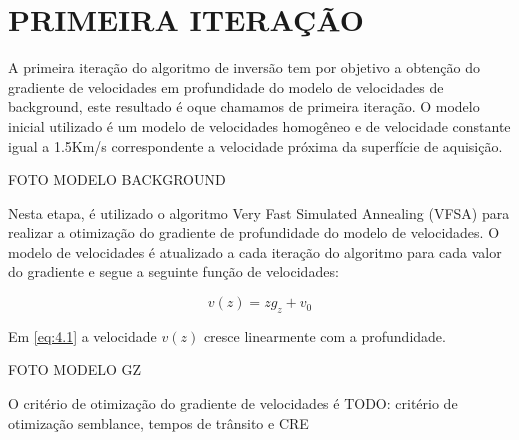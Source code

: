 \chapter{PRIMEIRA ITERAÇÃO}
\label{cap4}

A primeira iteração do algoritmo de inversão tem por objetivo a obtenção do gradiente de
velocidades em profundidade do modelo de velocidades de background, este resultado é oque
chamamos de primeira iteração. O modelo inicial utilizado é um modelo de velocidades homogêneo
e de velocidade constante igual a 1.5Km/s correspondente a velocidade próxima da superfície de aquisição. 

FOTO MODELO BACKGROUND

Nesta etapa, é utilizado o algoritmo Very Fast Simulated Annealing (VFSA) para realizar a otimização do
gradiente de profundidade do modelo de velocidades. O modelo de velocidades é atualizado a cada iteração do
algoritmo para cada valor do gradiente e segue a seguinte função de velocidades:

\begin{equation}
\label{eq:4.1}
v(z)=z g_z+v_0
\end{equation}

Em \ref{eq:4.1} a velocidade $v(z)$ cresce linearmente com a profundidade.

FOTO MODELO GZ

O critério de otimização do gradiente de velocidades é 
TODO: critério de otimização semblance, tempos de trânsito e CRE




